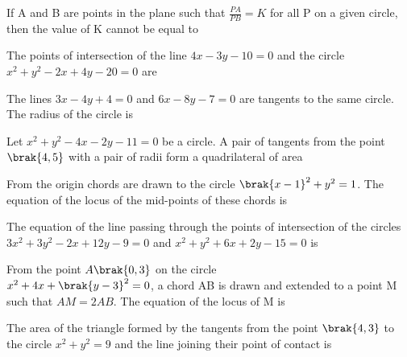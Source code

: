 
                                         




\iffalse
\title{CHAPTER 8- Circles}
\author{EE24BTECH11021 - Eshan Ray}
\section{fitb}
\fi
    
  

	\item If A and B are points in the plane such that        $\frac{PA}{PB}=K$ for all P on a given circle, then the value of K cannot be equal to

		\hfill{}
\item The points of intersection of the line $4x-3y-10=0$ and the circle $x^{2}+y^{2}-2x+4y-20=0$ are    

	\hfill{}
\item The lines $3x-4y+4=0$ and $6x-8y-7=0$ are tangents to the same circle. The radius of the circle is

	\hfill{}
\item Let $x^{2}+y^{2}-4x-2y-11=0$ be a circle. A pair of tangents from the point $\brak{4,5}$ with a pair of radii form a quadrilateral of area

	\hfill{}
\item From the origin chords are drawn  to the circle $\brak{x-1}^{2}+y^{2}=1$. The equation of the locus of the mid-points of these chords is

	\hfill{}
\item The equation of the line passing through the points of intersection of the circles\\ $3x^{2}+3y^{2}-2x+12y-9=0$ and $x^{2}+y^{2}+6x+2y-15=0$ is

	\hfill{}
\item From the point $A\brak{0,3}$ on the circle \\            $x^{2}+4x+\brak{y-3}^{2}=0$, a chord AB is drawn and extended to a point M such that $AM=2AB$. The equation of the locus of M is 

	\hfill{}
\item The area of the triangle formed by the tangents from the point $\brak{4,3}$ to the circle $x^{2}+y^{2}=9$ and the line joining their point of contact is

